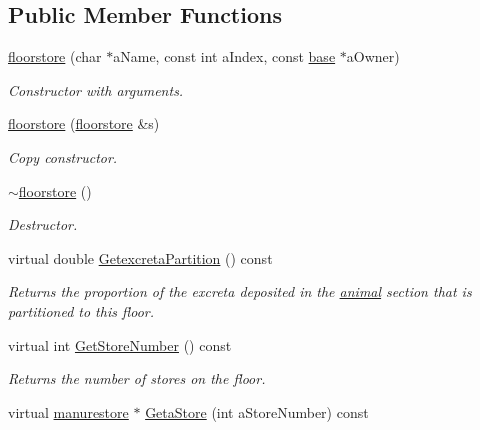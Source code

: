 \subsection*{Public Member Functions}
\begin{DoxyCompactItemize}
\item 
\hyperlink{classfloorstore_a4abf691b90bf18a3025e0f0e96dec9c7}{floorstore} (char $\ast$aName, const int aIndex, const \hyperlink{classbase}{base} $\ast$aOwner)
\begin{DoxyCompactList}\small\item\em Constructor with arguments. \item\end{DoxyCompactList}\item 
\hyperlink{classfloorstore_a0f20ffd8a3e31dce925bf0959b7cf70b}{floorstore} (\hyperlink{classfloorstore}{floorstore} \&s)
\begin{DoxyCompactList}\small\item\em Copy constructor. \item\end{DoxyCompactList}\item 
\hyperlink{classfloorstore_ac9fb0eaa78651fdf80a8effbeb77bdd3}{$\sim$floorstore} ()
\begin{DoxyCompactList}\small\item\em Destructor. \item\end{DoxyCompactList}\item 
virtual double \hyperlink{classfloorstore_ac5c125d05321b8e7e26111d51f17f30c}{GetexcretaPartition} () const 
\begin{DoxyCompactList}\small\item\em Returns the proportion of the excreta deposited in the \hyperlink{classanimal}{animal} section that is partitioned to this floor. \item\end{DoxyCompactList}\item 
virtual int \hyperlink{classfloorstore_a5222c3797cf8a2f443ab387478e9946d}{GetStoreNumber} () const 
\begin{DoxyCompactList}\small\item\em Returns the number of stores on the floor. \item\end{DoxyCompactList}\item 
virtual \hyperlink{classmanurestore}{manurestore} $\ast$ \hyperlink{classfloorstore_af05d6f52ff047513b85b5cd660b8e8fc}{GetaStore} (int aStoreNumber) const 

\end{DoxyCompactItemize}
